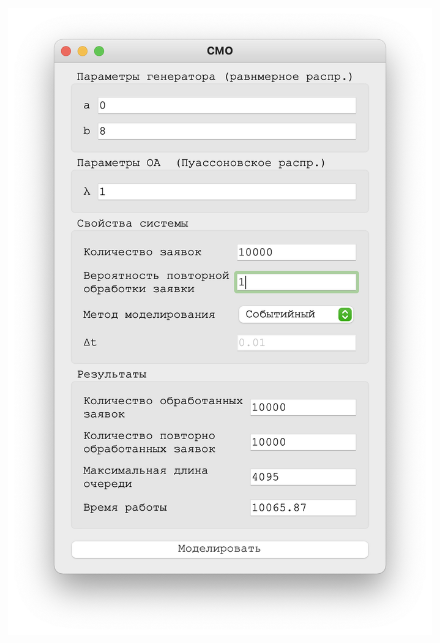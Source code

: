  \begin{figure}[!htb]
    \begin{minipage}{0.55\textwidth}
      \centering
      \includegraphics[width=1\linewidth]{1-1-s}
    \end{minipage}\hfill
    \begin{minipage}{0.55\textwidth}
      \centering

\end{minipage}
\end{figure}
